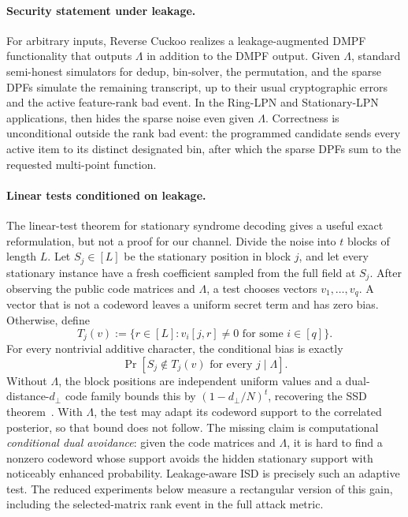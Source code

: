 \paragraph{Security statement under leakage.}
For arbitrary inputs, Reverse Cuckoo realizes a leakage-augmented DMPF
functionality that outputs $\Lambda$ in addition to the DMPF output.  Given
$\Lambda$, standard semi-honest simulators for \textsf{dedup},
\textsf{bin-solver}, the permutation, and the sparse DPFs simulate the
remaining transcript, up to their usual cryptographic errors and the active
feature-rank bad event.  In the Ring-LPN and Stationary-LPN applications,
 then hides the sparse noise even
given $\Lambda$.  Correctness is unconditional outside the rank bad event:
the programmed candidate sends every active item to its distinct designated
bin, after which the sparse DPFs sum to the requested multi-point function.

\paragraph{Linear tests conditioned on leakage.}
The linear-test theorem for stationary syndrome decoding gives a useful exact
reformulation, but not a proof for our channel.  Divide the noise into $t$
blocks of length $L$.  Let $S_j\in[L]$ be the stationary position in block
$j$, and let every stationary instance have a fresh coefficient sampled from
the full field at $S_j$.  After observing the public code matrices and
$\Lambda$, a test chooses vectors $v_1,\ldots,v_q$.  A vector that is not a
codeword leaves a uniform secret term and has zero bias.  Otherwise, define
\[
 T_j(v):=\{r\in[L]:v_i[j,r]\ne0\text{ for some }i\in[q]\}.
\]
For every nontrivial additive character, the conditional bias is exactly
\begin{equation}\label{eq:rev-cuckoo-conditional-linear-bias}
 \Pr[S_j\notin T_j(v)\text{ for every }j\mid\Lambda].
\end{equation}
Without $\Lambda$, the block positions are independent uniform values and a
dual-distance-$d_\perp$ code family bounds this by
$(1-d_\perp/N)^t$, recovering the SSD theorem~\cite{Stationary}.  With
$\Lambda$, the test may adapt its codeword support to the correlated posterior,
so that bound does not follow.  The missing claim is computational
\emph{conditional dual avoidance}: given the code matrices and $\Lambda$, it
is hard to find a nonzero codeword whose support avoids the hidden stationary
support with noticeably enhanced probability.  Leakage-aware ISD is precisely
such an adaptive test.  The reduced experiments below measure a rectangular
version of this gain, including the selected-matrix rank event in the full
attack metric.

